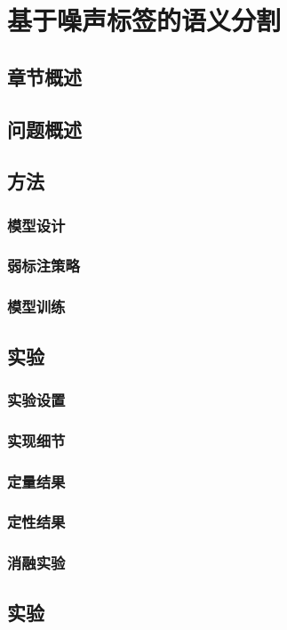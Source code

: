 \chapter{基于噪声标签的语义分割}

\section{章节概述}


\section{问题概述}


\section{方法}


\subsection{模型设计}


\subsection{弱标注策略}


\subsection{模型训练}



\section{实验}


\subsection{实验设置}




\subsection{实现细节}




\subsection{定量结果}




\subsection{定性结果}




\subsection{消融实验}



\section{实验}
